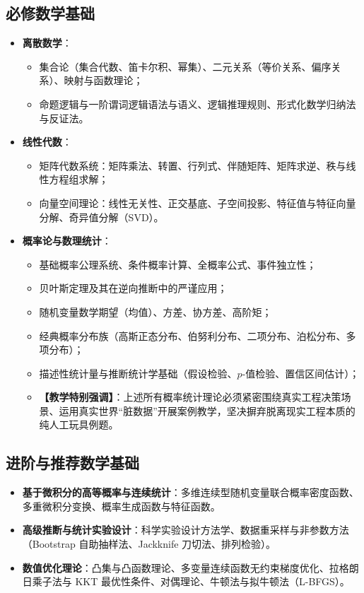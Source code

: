 \subsection{必修数学基础}
\begin{itemize}
    \item \textbf{离散数学}：
    \begin{itemize}
        \item 集合论（集合代数、笛卡尔积、幂集）、二元关系（等价关系、偏序关系）、映射与函数理论；
        \item 命题逻辑与一阶谓词逻辑语法与语义、逻辑推理规则、形式化数学归纳法与反证法。
    \end{itemize}
    \item \textbf{线性代数}：
    \begin{itemize}
        \item 矩阵代数系统：矩阵乘法、转置、行列式、伴随矩阵、矩阵求逆、秩与线性方程组求解；
        \item 向量空间理论：线性无关性、正交基底、子空间投影、特征值与特征向量分解、奇异值分解（SVD）。
    \end{itemize}
    \item \textbf{概率论与数理统计}：
    \begin{itemize}
        \item 基础概率公理系统、条件概率计算、全概率公式、事件独立性；
        \item 贝叶斯定理及其在逆向推断中的严谨应用；
        \item 随机变量数学期望（均值）、方差、协方差、高阶矩；
        \item 经典概率分布族（高斯正态分布、伯努利分布、二项分布、泊松分布、多项分布）；
        \item 描述性统计量与推断统计学基础（假设检验、$p$-值检验、置信区间估计）；
        \item \textbf{【教学特别强调】}：上述所有概率统计理论必须紧密围绕真实工程决策场景、运用真实世界“脏数据”开展案例教学，坚决摒弃脱离现实工程本质的纯人工玩具例题。
    \end{itemize}
\end{itemize}

\subsection{进阶与推荐数学基础}
\begin{itemize}
    \item \textbf{基于微积分的高等概率与连续统计}：多维连续型随机变量联合概率密度函数、多重微积分变换、概率生成函数与特征函数。
    \item \textbf{高级推断与统计实验设计}：科学实验设计方法学、数据重采样与非参数方法（Bootstrap 自助抽样法、Jackknife 刀切法、排列检验）。
    \item \textbf{数值优化理论}：凸集与凸函数理论、多变量连续函数无约束梯度优化、拉格朗日乘子法与 KKT 最优性条件、对偶理论、牛顿法与拟牛顿法（L-BFGS）。
\end{itemize}

